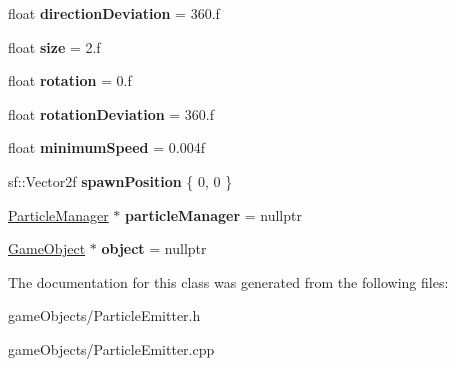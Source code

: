 \begin{DoxyCompactItemize}
\item 
\hypertarget{class_particle_emitter_ab5cee07d425137bc979058bed2fc7b91}{float {\bfseries direction\+Deviation} = 360.f}\label{class_particle_emitter_ab5cee07d425137bc979058bed2fc7b91}

\item 
\hypertarget{class_particle_emitter_a36dcead124ad38150b8f21feda7115d8}{float {\bfseries size} = 2.f}\label{class_particle_emitter_a36dcead124ad38150b8f21feda7115d8}

\item 
\hypertarget{class_particle_emitter_aef5ed3707677d9fdf0e411276a8be6ab}{float {\bfseries rotation} = 0.f}\label{class_particle_emitter_aef5ed3707677d9fdf0e411276a8be6ab}

\item 
\hypertarget{class_particle_emitter_a2ccd7416ae393bace934fe2b415f64cf}{float {\bfseries rotation\+Deviation} = 360.f}\label{class_particle_emitter_a2ccd7416ae393bace934fe2b415f64cf}

\item 
\hypertarget{class_particle_emitter_a6618d5435d8fe332e26656c20aecb7a6}{float {\bfseries minimum\+Speed} = 0.\+004f}\label{class_particle_emitter_a6618d5435d8fe332e26656c20aecb7a6}

\item 
\hypertarget{class_particle_emitter_ae43520e60f9102c9626f110090830ae1}{sf\+::\+Vector2f {\bfseries spawn\+Position} \{ 0, 0 \}}\label{class_particle_emitter_ae43520e60f9102c9626f110090830ae1}

\item 
\hypertarget{class_particle_emitter_ac89ef51ef2739ef7bc39461b6d4e3d17}{\hyperlink{class_particle_manager}{Particle\+Manager} $\ast$ {\bfseries particle\+Manager} = nullptr}\label{class_particle_emitter_ac89ef51ef2739ef7bc39461b6d4e3d17}

\item 
\hypertarget{class_particle_emitter_a558c0bd0ad1193482111782f488cadb2}{\hyperlink{class_game_object}{Game\+Object} $\ast$ {\bfseries object} = nullptr}\label{class_particle_emitter_a558c0bd0ad1193482111782f488cadb2}

\end{DoxyCompactItemize}


The documentation for this class was generated from the following files\+:\begin{DoxyCompactItemize}
\item 
game\+Objects/Particle\+Emitter.\+h\item 
game\+Objects/Particle\+Emitter.\+cpp\end{DoxyCompactItemize}
